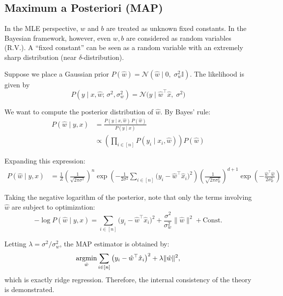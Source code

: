\documentclass[../main]{subfiles}
\begin{document}
\subsection{Maximum a Posteriori (MAP)}

  In the MLE perspective, $w$ and $b$ are treated as unknown fixed constants. 
  In the Bayesian framework, however, even $w,b$ are considered as random variables (R.V.). 
  A  ``fixed constant'' can be seen as a random variable with an extremely sharp distribution (near $\delta$-distribution).
  
  Suppose we place a Gaussian prior $
    P(\hat w) = \mathcal N(\hat w \mid 0,\; \sigma_w^2 \mathbb I)$.
  The likelihood is given by
  \begin{equation}
      P(y \mid x, \hat w;\, \sigma^2, \sigma_w^2) = \mathcal N\!\big(y \mid \hat w^\top \hat x,\; \sigma^2\big)
  \end{equation}
  
  We want to compute the posterior distribution of $\hat w$. By Bayes' rule:
  \begin{align*}
    P(\hat w \mid y,x) 
    &= \frac{P(y \mid x, \hat w)\, P(\hat w)}{P(y \mid x)} \\
    &\propto \left( \prod_{i\in[n]} P(y_i \mid x_i, \hat w) \right) P(\hat w)
  \end{align*}
  
  Expanding this expression:
  \begin{align*}
    P(\hat w \mid y,x) 
    &= \frac{1}{Z}
       \left(\frac{1}{\sqrt{2\pi\sigma^2}}\right)^n
       \exp\left(-\frac{1}{2\sigma^2}\sum_{i\in[n]} \big(y_i-\hat w^\top \hat x_i\big)^2\right) 
       \left(\frac{1}{\sqrt{2\pi\sigma_w^2}}\right)^{d+1}
       \exp\left(-\frac{\hat w^\top \hat w}{2\sigma_w^2}\right)
  \end{align*}
  
  Taking the negative logarithm of the posterior, note that only the terms involving $\hat w$ are subject to optimization:
  \[
    -\log P(\hat w \mid y,x) 
    = \sum_{i\in[n]} \big(y_i-\hat w^\top \hat x_i\big)^2 
      + \frac{\sigma^2}{\sigma_w^2} \|\hat w\|^2 + \text{Const}.
  \]
  
  Letting $\lambda = \sigma^2/\sigma_w^2$, the MAP estimator is obtained by:
  \begin{equation}
      \mathop{\mathrm{argmin}}_{\hat w} \sum_{i\in[n]} \big(y_i-\hat w^\top \hat x_i\big)^2 + \lambda \|\hat w\|^2,
  \end{equation}
  which is exactly ridge regression. Therefore, the internal consistency of the theory is demonstrated.
\end{document}
